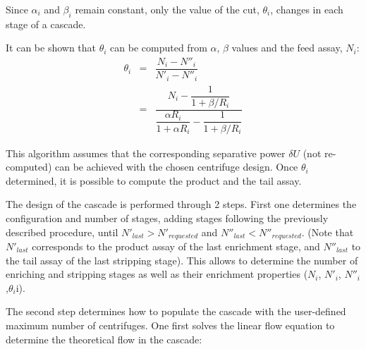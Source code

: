 \documentclass{anstrans}
\begin{document}
Since $\alpha_{i}$ and $\beta_{i}$ remain constant, only the value of the cut,
$\theta_{i}$, changes in each stage of a cascade.

It can be shown that $\theta_{i}$ can be computed from $\alpha$,
$\beta$ values and the feed assay, $N_{i}$:
\begin{eqnarray}
    \theta_{i} &=& \dfrac{N_{i} - N''_{i}}{N'_{i}-N''_{i}}\nonumber\\
           &=& \dfrac{N_{i} - \dfrac{1}{1 + \beta/R_{i}}}{ \dfrac{\alpha R_{i}}{1 + \alpha R_{i}} -
           \dfrac{1}{1 + \beta/R_{i}}}
\end{eqnarray}

This algorithm assumes that the corresponding separative power $\delta U$ (not
re-computed) can be achieved with the chosen centrifuge design. Once
$\theta_{i}$ determined, it is possible to compute the product and the tail
assay.

The design of the cascade is performed through 2 steps. First one determines the
configuration and number of stages, adding stages following the previously
described procedure, until $N'_{last} > N'_{requested}$ and $N''_{last} <
N''_{requested}$. (Note that $N'_{last}$ corresponds to the product assay of the
last enrichment stage, and $N''_{last}$ to the tail assay of the last stripping
stage). This allows to determine the number of enriching and stripping stages as
well as their enrichment properties ($N_{i}$, $N'_{i}$,
$N''_{i}$,$\theta_{i}$i).

The second step determines how to populate the cascade with the user-defined
maximum number of centrifuges. One first solves the linear flow equation to
determine the theoretical flow in the cascade:
\end{document}
